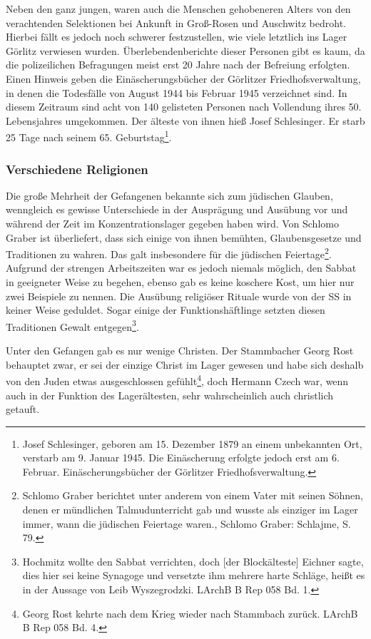 \documentclass[a4paper,12pt,ngerman,
]{nisebook}
\begin{document}
Neben den ganz jungen, waren auch die Menschen gehobeneren Alters von den verachtenden Selektionen bei Ankunft in Groß-Rosen und Auschwitz bedroht. Hierbei fällt es jedoch noch schwerer festzustellen, wie viele letztlich ins Lager Görlitz verwiesen wurden. Überlebendenberichte dieser Personen gibt es kaum, da die polizeilichen Befragungen meist erst 20 Jahre nach der Befreiung erfolgten. Einen Hinweis geben die Einäscherungsbücher der Görlitzer Friedhofsverwaltung, in denen die Todesfälle von August 1944 bis Februar 1945 verzeichnet sind. In diesem Zeitraum sind acht von 140 gelisteten Personen nach Vollendung ihres 50. Lebensjahres umgekommen. Der älteste von ihnen hieß Josef Schlesinger. Er starb 25 Tage nach seinem 65. Geburtstag\footnote{Josef Schlesinger, geboren am 15. Dezember 1879 an einem unbekannten Ort, verstarb am 9. Januar 1945. Die Einäscherung erfolgte jedoch erst am 6. Februar. Einäscherungsbücher der Görlitzer Friedhofsverwaltung.}.\label{alter}

\subsubsection{Verschiedene Religionen}
Die große Mehrheit der Gefangenen bekannte sich zum jüdischen Glauben, wenngleich es gewisse Unterschiede in der Ausprägung und Ausübung vor und während der Zeit im Konzentrationslager gegeben haben wird. Von Schlomo Graber ist überliefert, dass sich einige von ihnen bemühten, Glaubensgesetze und Traditionen zu wahren. Das galt insbesondere für die jüdischen Feiertage\footnote{Schlomo Graber berichtet unter anderem von einem Vater mit seinen Söhnen, denen er mündlichen Talmudunterricht gab und \glqq wusste als einziger im Lager immer, wann die jüdischen Feiertage waren.\grqq, Schlomo Graber: Schlajme, S. 79.}. Aufgrund der strengen Arbeitszeiten war es jedoch niemals möglich, den Sabbat in geeigneter Weise zu begehen, ebenso gab es keine koschere Kost, um hier nur zwei Beispiele zu nennen.
Die Ausübung religiöser Rituale wurde von der SS in keiner Weise geduldet. Sogar einige der Funktionshäftlinge setzten diesen Traditionen Gewalt entgegen\footnote{ Hochmitz wollte den Sabbat verrichten, doch [der Blockälteste] Eichner sagte, dies hier sei keine Synagoge und versetzte ihm mehrere harte Schläge\grqq, heißt es in der Aussage von Leib Wyszegrodzki. LArchB B Rep 058 Bd. 1.}.

Unter den Gefangen gab es nur wenige Christen. Der Stammbacher Georg Rost behauptet zwar, er sei der einzige Christ im Lager gewesen und habe sich deshalb von den Juden etwas ausgeschlossen gefühlt\footnote{Georg Rost kehrte nach dem Krieg wieder nach Stammbach zurück. LArchB B Rep 058 Bd. 4.}, doch Hermann Czech war, wenn auch in der Funktion des Lagerältesten, sehr wahrscheinlich auch christlich getauft.
\end{document}
